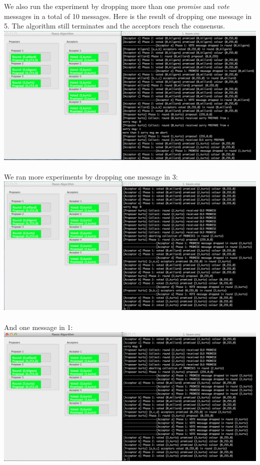 \documentclass[a4paper, 11pt]{article}
\begin{document}
\newpage
We also run the experiment by dropping more than one \textit{promise} and \textit{vote} messages in a total of 10 messages. Here is the result of dropping one message in 5. The algorithm still terminates and the acceptors reach the consensus.\\
\includegraphics[scale=0.35]{images/exp7-drop5.png} \\\\
We ran more experiments by dropping one message in 3:\\
\includegraphics[scale=0.35]{images/exp7-drop3.png} \\\\
\newpage
And one message in 1:\\
\includegraphics[scale=0.35]{images/exp7-drop1.png} \\\\
\end{document}
